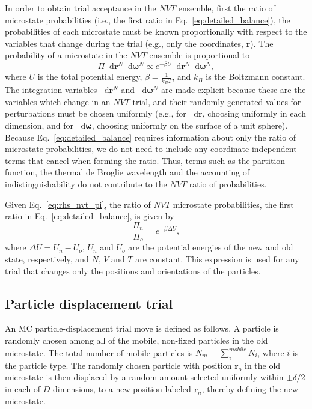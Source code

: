 \documentclass[
  9pt,
  bestpractices,
]{livecoms}
\newcommand*\diff{\mathop{}\!\mathrm{d}}
\begin{document}
In order to obtain trial acceptance in the $NVT$ ensemble, first the ratio of microstate probabilities (i.e., the first ratio in Eq.~\ref{eq:detailed_balance}), the probabilities of each microstate must be known proportionally with respect to the variables that change during the trial (e.g., only the coordinates, $\mathbf{r}$).
The probability of a microstate in the $NVT$ ensemble is proportional to \cite{allen_computer_1989, frenkel_understanding_2002}
\begin{equation}
\Pi \diff\mathbf{r}^N\diff\boldsymbol{\omega}^N \propto e^{-\beta U} \diff\mathbf{r}^N\diff\boldsymbol{\omega}^N,
\label{eq:rhs_nvt_pi}
\end{equation}
where $U$ is the total potential energy, $\beta=\frac{1}{k_B T}$, and $k_B$ is the Boltzmann constant.
The integration variables $\diff\mathbf{r}^{N}$ and $\diff\boldsymbol{\omega}^{N}$ are made explicit because these are the variables which change in an $NVT$ trial, and their randomly generated values for perturbations must be chosen uniformly (e.g., for $\diff\mathbf{r}$, choosing uniformly in each dimension, and for $\diff\boldsymbol{\omega}$, choosing uniformly on the surface of a unit sphere).
Because Eq.~\ref{eq:detailed_balance} requires information about only the ratio of microstate probabilities, we do not need to include any coordinate-independent terms that cancel when forming the ratio.
Thus, terms such as the partition function, the thermal de Broglie wavelength and the accounting of indistinguishability do not contribute to the $NVT$ ratio of probabilities.

Given Eq.~\ref{eq:rhs_nvt_pi}, the ratio of $NVT$ microstate probabilities, the first ratio in Eq.~\ref{eq:detailed_balance}, is given by
\begin{equation}
\frac{\Pi_n}{\Pi_o} = e^{-\beta\Delta U},
\label{eq:rhs_nvt}
\end{equation}
where $\Delta U = U_n - U_o$, $U_n$ and $U_o$ are the potential energies of the new and old state, respectively, and $N$, $V$ and $T$ are constant.
This expression is used for any trial that changes only the positions and orientations of the particles.

\subsection{\label{sec:lhs_displacement}Particle displacement trial}

An MC particle-displacement trial move is defined as follows.
A particle is randomly chosen among all of the mobile, non-fixed particles in the old microstate.
The total number of mobile particles is $N_m=\sum_i^{mobile} N_i$, where $i$ is the particle type.
The randomly chosen particle with position $\mathbf{r}_o$ in the old microstate is then displaced by a random amount selected uniformly within $\pm\delta/2$ in each of $D$ dimensions, to a new position labeled $\mathbf{r}_n$, thereby defining the new microstate.
\end{document}
